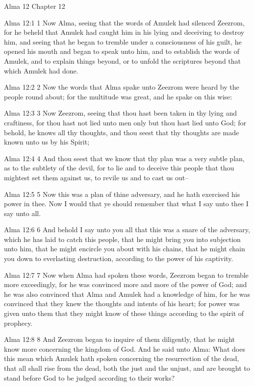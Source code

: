 Alma 12
Chapter 12

Alma 12:1
 1 Now Alma, seeing that the words of Amulek had silenced
Zeezrom, for he beheld that Amulek had caught him in his lying
and deceiving to destroy him, and seeing that he began to tremble
under a consciousness of his guilt, he opened his mouth and began
to speak unto him, and to establish the words of Amulek, and to
explain things beyond, or to unfold the scriptures beyond that
which Amulek had done.

Alma 12:2
 2 Now the words that Alma spake unto Zeezrom were heard by the
people round about; for the multitude was great, and he spake on
this wise:

Alma 12:3
 3 Now Zeezrom, seeing that thou hast been taken in thy lying and
craftiness, for thou hast not lied unto men only but thou hast
lied unto God; for behold, he knows all thy thoughts, and thou
seest that thy thoughts are made known unto us by his Spirit;

Alma 12:4
 4 And thou seest that we know that thy plan was a very subtle
plan, as to the subtlety of the devil, for to lie and to deceive
this people that thou mightest set them against us, to revile us
and to cast us out--

Alma 12:5
 5 Now this was a plan of thine adversary, and he hath exercised
his power in thee. Now I would that ye should remember that what
I say unto thee I say unto all.

Alma 12:6
 6 And behold I say unto you all that this was a snare of the
adversary, which he has laid to catch this people, that he might
bring you into subjection unto him, that he might encircle you
about with his chains, that he might chain you down to
everlasting destruction, according to the power of his captivity.

Alma 12:7
 7 Now when Alma had spoken these words, Zeezrom began to tremble
more exceedingly, for he was convinced more and more of the power
of God; and he was also convinced that Alma and Amulek had a
knowledge of him, for he was convinced that they knew the
thoughts and intents of his heart; for power was given unto them
that they might know of these things according to the spirit of
prophecy.

Alma 12:8
 8 And Zeezrom began to inquire of them diligently, that he might
know more concerning the kingdom of God. And he said unto Alma:
What does this mean which Amulek hath spoken concerning the
resurrection of the dead, that all shall rise from the dead, both
the just and the unjust, and are brought to stand before God to
be judged according to their works?

